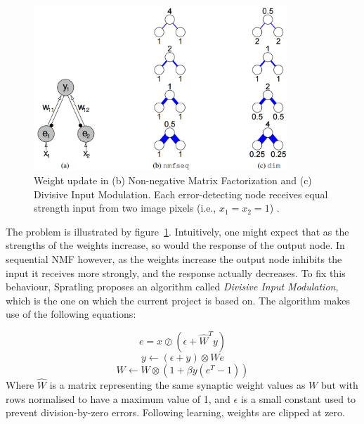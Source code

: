 \documentclass[11pt,a4paper]{report}
\begin{document}
			\begin{figure}[h]
				\centering
				\includegraphics[width=0.85\textwidth]{nmf_problem}
				\caption[Graphical explanation of the problem in NMF.]{Weight update in (b) Non-negative Matrix Factorization and (c) Divisive Input Modulation.  Each error-detecting node receives equal strength input from two image pixels (i.e., $x_1 = x_2 = 1$) \cite{spratling2009unsupervised}.}
				\label{fig:nmf_problem}
			\end{figure}	
					
			The problem is illustrated by figure~\ref{fig:nmf_problem}. Intuitively, one might expect that as the strengths of the weights increase, so would the response of the output node. In sequential NMF however, as the weights increase the output node inhibits the input it receives more strongly, and the response actually decreases. To fix this behaviour, Spratling \cite{spratling2009unsupervised} proposes an algorithm called \emph{Divisive Input Modulation}, which is the one on which the current project is based on. The algorithm makes use of the following equations:
			
			\newpage
			
			\begin{equation}
				e = x \oslash (\epsilon + \hat{W}^T y)
			\end{equation}
			\begin{equation}
				y \leftarrow (\epsilon + y) \otimes We
			\end{equation}
			\begin{equation}
				W \leftarrow W \otimes (1 + \beta y (e^T - 1))
			\end{equation}
			Where $\hat{W}$ is a matrix representing the same synaptic weight values as $W$ but with rows normalised to have a maximum value of 1, and $\epsilon$ is a small constant used to prevent division-by-zero errors. Following learning, weights are clipped at zero.
			
\end{document}
